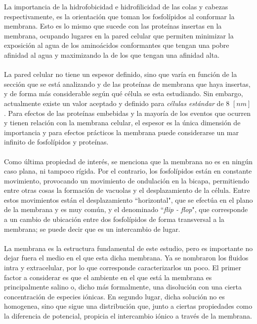 \documentclass[12pt, oneside, numbers, spanish]{ezthesis}
\numberwithin{equation}{section}
\begin{document}
La importancia de la hidrofobicidad e hidrofilicidad de las colas y cabezas respectivamente, es la orientación que toman los fosfolípidos al conformar la membrana. Esto es lo mismo que sucede con las proteínas insertas en la membrana, ocupando lugares en la pared celular que permiten minimizar la exposición al agua de los aminoácidos conformantes que tengan una pobre afinidad al agua y maximizando la de los que tengan una afinidad alta.\\\\
La pared celular no tiene un espesor definido, sino que varía en función de la sección que se está analizando y de las proteínas de membrana que haya insertas, y de forma más considerable según qué célula se esta estudiando. Sin embargo, actualmente existe un valor aceptado y definido para \textit{células estándar} de 8 $[nm]$ \cite{Lombard}. Para efectos de las proteínas embebidas y la mayoría de los eventos que ocurren y tienen relación con la membrana celular, el espesor es la única dimensión de importancia y para efectos prácticos la membrana puede considerarse un mar infinito de fosfolípidos y proteínas.\\\\
Como última propiedad de interés, se menciona que la membrana no es en ningún caso plana, ni tampoco rígida. Por el contrario, los fosfolípidos están en constante movimiento, provocando un movimiento de ondulación en la bicapa, permitiendo entre otras cosas la formación de vacuolas y el desplazamiento de la célula. Entre estos movimientos están el desplazamiento ``horizontal", que se efectúa en el plano de la membrana y es muy común, y el denominado ``\textit{flip - flop}", que corresponde a un cambio de ubicación entre dos fosfolípidos de forma transversal a la membrana; se puede decir que es un intercambio de lugar.\\\\
La membrana es la estructura fundamental de este estudio, pero es importante no dejar fuera el medio en el que esta dicha membrana. Ya se nombraron los fluidos intra y extracelular, por lo que corresponde caracterizarlos un poco. El primer factor a considerar es que el ambiente en el que está la membrana es principalmente salino o, dicho más formalmente, una disolución con una cierta concentración de especies iónicas. En segundo lugar, dicha solución no es homogenea, sino que sigue una distribución que, junto a ciertas propiedades como la diferencia de potencial, propicia el intercambio iónico a través de la membrana.
\end{document}

